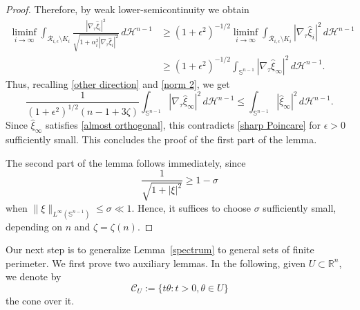 \documentclass[reqno,11pt]{amsart}
\def\ez{\epsilon}
\def\sz{\sigma}
\numberwithin{equation}{section}
\theoremstyle{remark}
\begin{document}
\begin{proof}
Therefore, by weak lower-semicontinuity we obtain
\begin{align}
\liminf_{i\to \infty}\int_{\mathcal R_{i,\ez}\setminus K_i}  \frac{|\nabla_\tau \hat \xi_i|^2}{\sqrt{1+ \alpha_i^2|\nabla_\tau \hat \xi_i|^2}} \,d\mathscr H^{n-1}& \ge  (1+\ez^2)^{-1/2} \liminf_{i\to \infty} \int_{\mathcal R_{i,\ez}\setminus K_i} |\nabla_\tau \hat \xi_i|^2  \,d\mathscr H^{n-1} \nonumber\\
& \ge  (1+\ez^2)^{-1/2} \int_{\mathbb S^{n-1}} |\nabla_\tau \hat \xi_\infty|^2 \,d\mathscr H^{n-1}. \label{gradient convergence}
\end{align}
Thus, recalling \eqref{other direction} and \eqref{norm 2}, we get
$$
    \frac{1}{(1+\ez^2)^{1/2} \left(n-1+  3 \zeta\right)} \int_{\mathbb S^{n-1}} {|\nabla_\tau  \hat \xi_\infty|^2}  \,d\mathscr H^{n-1}\le  \int_{\mathbb S^{n-1}} |\hat \xi_\infty|^2  \,d\mathscr H^{n-1}.
$$
Since $\hat \xi_\infty$ satisfies \eqref{almost orthogonal},
this contradicts \eqref{sharp Poincare} for $\ez>0$ sufficiently small. This concludes the proof of the first part of the lemma.

The second part of the lemma follows immediately, since 
$$\frac {1}{\sqrt{1+|\xi|^2}}\ge 1-\sz$$
when  $\|\xi\|_{L^{\infty}(\mathbb S^{n-1})}\le \sz \ll 1.$ Hence, it suffices to  choose $\sz$ sufficiently small, depending on $n$ and $\zeta=\zeta(n)$.
\end{proof}

Our next step is to generalize Lemma~\ref{spectrum} to general sets of finite perimeter. We first prove two auxiliary lemmas. 
In the following, given $U\subset \mathbb R^n$, we denote by $$\mathcal{C}_{U}:=\big\{t\theta\colon t>0, \theta\in U\big\}$$ 
the cone over it.
 
 
 
 
 
\end{document}
